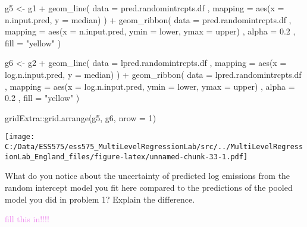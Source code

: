 \documentclass[
]{article}
\newenvironment{Shaded}{\begin{snugshade}}{\end{snugshade}}
\newcommand{\AttributeTok}[1]{\textcolor[rgb]{0.77,0.63,0.00}{#1}}
\newcommand{\DecValTok}[1]{\textcolor[rgb]{0.00,0.00,0.81}{#1}}
\newcommand{\FloatTok}[1]{\textcolor[rgb]{0.00,0.00,0.81}{#1}}
\newcommand{\FunctionTok}[1]{\textcolor[rgb]{0.00,0.00,0.00}{#1}}
\newcommand{\NormalTok}[1]{#1}
\newcommand{\OtherTok}[1]{\textcolor[rgb]{0.56,0.35,0.01}{#1}}
\newcommand{\SpecialCharTok}[1]{\textcolor[rgb]{0.00,0.00,0.00}{#1}}
\newcommand{\StringTok}[1]{\textcolor[rgb]{0.31,0.60,0.02}{#1}}
\begin{document}
\begin{Shaded}
\begin{Highlighting}[]
\NormalTok{g5 }\OtherTok{\textless{}{-}}\NormalTok{ g1 }\SpecialCharTok{+}
  \FunctionTok{geom\_line}\NormalTok{(}
    \AttributeTok{data =}\NormalTok{ pred.randomintrcpts.df}
\NormalTok{    , }\AttributeTok{mapping =} \FunctionTok{aes}\NormalTok{(}\AttributeTok{x =}\NormalTok{ n.input.pred, }\AttributeTok{y =}\NormalTok{ median)}
\NormalTok{  ) }\SpecialCharTok{+}
  \FunctionTok{geom\_ribbon}\NormalTok{(}
    \AttributeTok{data =}\NormalTok{ pred.randomintrcpts.df}
\NormalTok{    , }\AttributeTok{mapping =} \FunctionTok{aes}\NormalTok{(}\AttributeTok{x =}\NormalTok{ n.input.pred, }\AttributeTok{ymin =}\NormalTok{ lower, }\AttributeTok{ymax =}\NormalTok{ upper)}
\NormalTok{    , }\AttributeTok{alpha =} \FloatTok{0.2}
\NormalTok{    , }\AttributeTok{fill =} \StringTok{"yellow"}
\NormalTok{  )}

\NormalTok{g6 }\OtherTok{\textless{}{-}}\NormalTok{ g2 }\SpecialCharTok{+}
  \FunctionTok{geom\_line}\NormalTok{(}
    \AttributeTok{data =}\NormalTok{ lpred.randomintrcpts.df}
\NormalTok{    , }\AttributeTok{mapping =} \FunctionTok{aes}\NormalTok{(}\AttributeTok{x =}\NormalTok{ log.n.input.pred, }\AttributeTok{y =}\NormalTok{ median)}
\NormalTok{  ) }\SpecialCharTok{+}
  \FunctionTok{geom\_ribbon}\NormalTok{(}
    \AttributeTok{data =}\NormalTok{ lpred.randomintrcpts.df}
\NormalTok{    , }\AttributeTok{mapping =} \FunctionTok{aes}\NormalTok{(}\AttributeTok{x =}\NormalTok{ log.n.input.pred, }\AttributeTok{ymin =}\NormalTok{ lower, }\AttributeTok{ymax =}\NormalTok{ upper)}
\NormalTok{    , }\AttributeTok{alpha =} \FloatTok{0.2}
\NormalTok{    , }\AttributeTok{fill =} \StringTok{"yellow"}
\NormalTok{  )}

\NormalTok{gridExtra}\SpecialCharTok{::}\FunctionTok{grid.arrange}\NormalTok{(g5, g6, }\AttributeTok{nrow =} \DecValTok{1}\NormalTok{)}
\end{Highlighting}
\end{Shaded}

\texttt{[image: C:/Data/ESS575/ess575\_MultiLevelRegressionLab/src/../MultiLevelRegressionLab\_England\_files/figure-latex/unnamed-chunk-33-1.pdf]}

What do you notice about the uncertainty of predicted log emissions from
the random intercept model you fit here compared to the predictions of
the pooled model you did in problem 1? Explain the difference.

\textcolor{violet}{fill this in!!!!}
\end{document}
